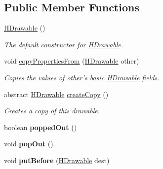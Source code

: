 \subsection*{Public Member Functions}
\begin{DoxyCompactItemize}
\item 
\hyperlink{classhype_1_1core_1_1drawable_1_1_h_drawable_ad92f7d4141143ac12489529b431a72e2}{H\-Drawable} ()
\begin{DoxyCompactList}\small\item\em The default constructor for \hyperlink{classhype_1_1core_1_1drawable_1_1_h_drawable}{H\-Drawable}. \end{DoxyCompactList}\item 
void \hyperlink{classhype_1_1core_1_1drawable_1_1_h_drawable_a5a24d647e0e8b14177218807e84ecde5}{copy\-Properties\-From} (\hyperlink{classhype_1_1core_1_1drawable_1_1_h_drawable}{H\-Drawable} other)
\begin{DoxyCompactList}\small\item\em Copies the values of {\ttfamily other}'s basic \hyperlink{classhype_1_1core_1_1drawable_1_1_h_drawable}{H\-Drawable} fields. \end{DoxyCompactList}\item 
abstract \hyperlink{classhype_1_1core_1_1drawable_1_1_h_drawable}{H\-Drawable} \hyperlink{classhype_1_1core_1_1drawable_1_1_h_drawable_aaee2df6588cdeebe4399e3e56af76410}{create\-Copy} ()
\begin{DoxyCompactList}\small\item\em Creates a copy of this drawable. \end{DoxyCompactList}\item 
\hypertarget{classhype_1_1core_1_1drawable_1_1_h_drawable_a51e65250968e8feaf780174e26b86090}{boolean {\bfseries popped\-Out} ()}\label{classhype_1_1core_1_1drawable_1_1_h_drawable_a51e65250968e8feaf780174e26b86090}

\item 
\hypertarget{classhype_1_1core_1_1drawable_1_1_h_drawable_a02281398a0a841322423bf1010302720}{void {\bfseries pop\-Out} ()}\label{classhype_1_1core_1_1drawable_1_1_h_drawable_a02281398a0a841322423bf1010302720}

\item 
\hypertarget{classhype_1_1core_1_1drawable_1_1_h_drawable_ab577a448fa3331fe86dffab5d5fb0dbf}{void {\bfseries put\-Before} (\hyperlink{classhype_1_1core_1_1drawable_1_1_h_drawable}{H\-Drawable} dest)}\label{classhype_1_1core_1_1drawable_1_1_h_drawable_ab577a448fa3331fe86dffab5d5fb0dbf}


\end{DoxyCompactItemize}
